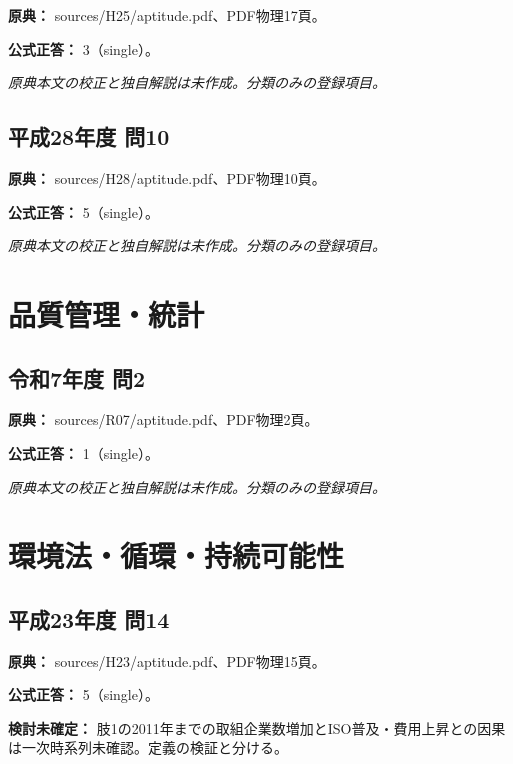 \noindent\textbf{原典：} sources/H25/aptitude.pdf、PDF物理17頁。

\textbf{公式正答：} 3（single）。

\par\textit{原典本文の校正と独自解説は未作成。分類のみの登録項目。}

\subsection{平成28年度 問10}
\label{q:h28-reg-apt-10}

\noindent\textbf{原典：} sources/H28/aptitude.pdf、PDF物理10頁。

\textbf{公式正答：} 5（single）。

\par\textit{原典本文の校正と独自解説は未作成。分類のみの登録項目。}

\section{品質管理・統計}

\subsection{令和7年度 問2}
\label{q:r07-reg-apt-02}

\noindent\textbf{原典：} sources/R07/aptitude.pdf、PDF物理2頁。

\textbf{公式正答：} 1（single）。

\par\textit{原典本文の校正と独自解説は未作成。分類のみの登録項目。}

\section{環境法・循環・持続可能性}

\subsection{平成23年度 問14}
\label{q:h23-reg-apt-14}

\noindent\textbf{原典：} sources/H23/aptitude.pdf、PDF物理15頁。

\textbf{公式正答：} 5（single）。

\par\textbf{検討未確定：} 肢1の2011年までの取組企業数増加とISO普及・費用上昇との因果は一次時系列未確認。定義の検証と分ける。

